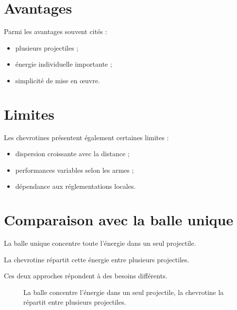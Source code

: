 \section{Avantages}

Parmi les avantages souvent cités :

\begin{itemize}
    \item plusieurs projectiles ;
    \item énergie individuelle importante ;
    \item simplicité de mise en œuvre.
\end{itemize}

\section{Limites}

Les chevrotines présentent également certaines limites :

\begin{itemize}
    \item dispersion croissante avec la distance ;
    \item performances variables selon les armes ;
    \item dépendance aux réglementations locales.
\end{itemize}

\section{Comparaison avec la balle unique}

La balle unique concentre toute l'énergie dans un seul projectile.

La chevrotine répartit cette énergie entre plusieurs projectiles.

Ces deux approches répondent à des besoins différents.

\begin{figure}[htbp]
\centering


\caption{La balle concentre l'énergie dans un seul projectile, la chevrotine la répartit entre plusieurs projectiles.}
\label{fig:energie_chevrotine}

\end{figure}


